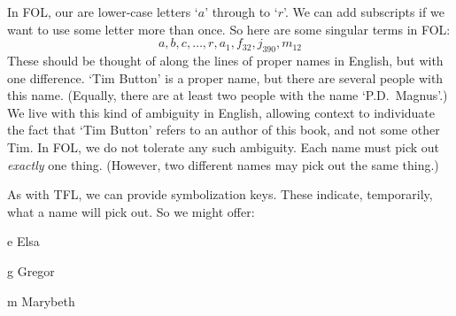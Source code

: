 In FOL, our  are lower-case letters `$a$' through to `$r$'. We can add subscripts if we want to use some letter more than once. So here are some singular terms in FOL:
	$$a,b,c,\ldots, r, a_1, f_{32}, j_{390}, m_{12}$$
These should be thought of along the lines of proper names in English, but with one difference. `Tim Button' is a proper name, but there are several people with this name. (Equally, there are  at least two people with the name `P.D.\ Magnus'.) We live with this kind of ambiguity in English, allowing context to individuate the fact that `Tim Button' refers to an author of this book, and not some other Tim. In FOL, we do not tolerate any such ambiguity. Each name must pick out \emph{exactly} one thing. (However, two different names may pick out the same thing.)


As with TFL, we can provide symbolization keys. These indicate, temporarily, what a name will pick out. So we might offer:
	\begin{ekey}
		\item[e] Elsa
		\item[g] Gregor
		\item[m] Marybeth
	\end{ekey}


